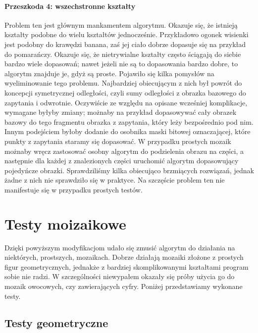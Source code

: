 \documentclass[a4paper,12pt,leqno]{article}
\begin{document}
\paragraph{Przeszkoda 4: wszechstronne kształty}
Problem ten jest głównym mankamentem algorytmu. Okazuje się, że istnieją kształty podobne do wielu kształtów jednocześnie. Przykładowo ogonek wisienki jest podobny do
krawędzi banana, zaś jej ciało dobrze dopasuje się na przykład do pomarańczy. Okazuje się, że nietrywialne kształty często ściągają do siebie bardzo wiele dopasowań;
nawet jeżeli nie są to dopasowania bardzo dobre, to algorytm znajduje je, gdyż są proste.
Pojawiło się kilka pomysłów na wyeliminowanie tego problemu. Najbardziej obiecującym z nich był powrót do koncepcji symetrycznej odległości, czyli sumy odległości z obrazka bazowego
do zapytania i odwrotnie. Oczywiście ze względu na opisane wcześniej komplikacje, wymagane byłyby zmiany; możnaby na przykład dopasowywać cały obrazek bazowy do tego fragmentu obrazka
z zapytania, który leży bezpośrednio pod nim. Innym podejściem byłoby dodanie do osobnika maski bitowej oznaczającej, które punkty z zapytania staramy się dopasować. W przypadku prostych
mozaik możnaby wręcz zastosować osobny algorytm do podzielenia obrazu na części, a następnie dla każdej z znalezionych części uruchomić algorytm dopasowujący pojedyńcze obrazki.
Sprawdziliśmy kilka obiecująco brzmiących rozwiązań, jednak żadne z nich nie sprawdziło się w praktyce. Na szczęście problem ten nie manifestuje się w przypadku prostych testów.

\section{Testy moizaikowe}

Dzięki powyższym modyfikacjom udało się zmusić algorytm do działania na niektórych, prostszych, mozaikach. Dobrze działają mozaiki złożone z prostych figur geometrycznych,
jednakże z bardziej skomplikowanymi kształtami program sobie nie radzi. W szczególności niewypałem okazały się próby użycia go do mozaik owocowych, czy zawierających cyfry.
Poniżej przedstawiamy wykonane testy.

\subsection{Testy geometryczne}
\end{document}
